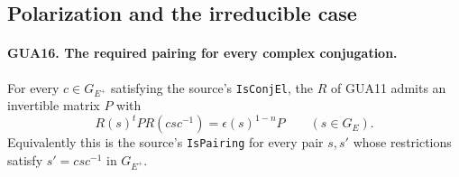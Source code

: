 \documentclass[11pt,a4paper]{article}
\numberwithin{equation}{section}
\theoremstyle{remark}\newtheorem{remark}[theorem]{Remark}
\begin{document}
\subsection{Polarization and the irreducible case}

\paragraph{GUA16. The required pairing for every complex conjugation.}
\label{claim:GUA16}
For every $c\in G_{E^+}$ satisfying the source's
\texttt{Is\allowbreak Conj\allowbreak El}, the $R$ of GUA11 admits an
invertible matrix $P$ with
\[
       R(s)^t P R(csc^{-1})=\epsilon(s)^{1-n}P
                                      \qquad(s\in G_E). 
                                                        \tag{GUA.22}
\]
Equivalently this is the source's \texttt{Is\allowbreak Pairing}
for every pair $s,s'$ whose restrictions satisfy
$s'=csc^{-1}$ in $G_{E^+}$.
\end{document}
